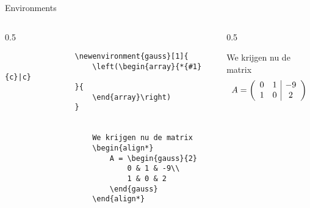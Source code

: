 \renewenvironment{examplegauss}[1]{
    \left(\begin{array}{*{#1}{c}|c}
}{
    \end{array}\right)
}

\begin{frame}[fragile]{Environments}
    \begin{columns}
        \begin{column}{0.5\textwidth}
            \begin{verbatim}
                \newenvironment{gauss}[1]{
                    \left(\begin{array}{*{#1}{c}|c}
                }{
                    \end{array}\right)
                }
        
                
                    We krijgen nu de matrix
                    \begin{align*}
                        A = \begin{gauss}{2}
                            0 & 1 & -9\\
                            1 & 0 & 2
                        \end{gauss}
                    \end{align*}
                
            \end{verbatim}
        \end{column}
        \begin{column}{0.5\textwidth}
            \begin{demobox}\small\setlength\parskip{5pt}    
                We krijgen nu de matrix
                \begin{align*}
                    A = \begin{examplegauss}{2}
                        0 & 1 & -9\\
                        1 & 0 & 2
                    \end{examplegauss}
                \end{align*}
            \end{demobox}
        \end{column}
    \end{columns}
\end{frame}
